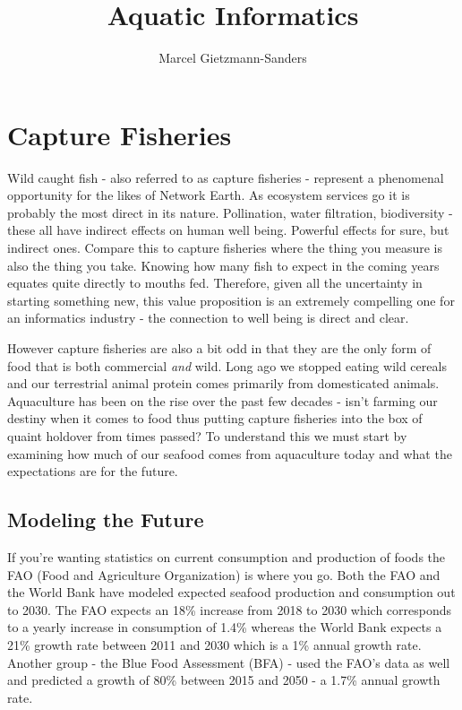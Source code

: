 \documentclass[11pt,a5paper]{book}
\title{Aquatic Informatics}
\author{Marcel Gietzmann-Sanders}
\date{}
\begin{document}
\maketitle
\tableofcontents
\newpage
\chapter{Capture Fisheries}
Wild caught fish - also referred to as capture fisheries - represent a phenomenal opportunity for the likes of Network Earth. As ecosystem services go it is probably the most direct in its nature. Pollination, water filtration, biodiversity - these all have indirect effects on human well being. Powerful effects for sure, but indirect ones. Compare this to capture fisheries where the thing you measure is also the thing you take. Knowing how many fish to expect in the coming years equates quite directly to mouths fed. Therefore, given all the uncertainty in starting something new, this value proposition is an extremely compelling one for an informatics industry - the connection to well being is direct and clear.
\newline

However capture fisheries are also a bit odd in that they are the only form of food that is both commercial \textit{and} wild. Long ago we stopped eating wild cereals and our terrestrial animal protein comes primarily from domesticated animals. Aquaculture has been on the rise over the past few decades - isn't farming our destiny when it comes to food thus putting capture fisheries into the box of quaint holdover from times passed? To understand this we must start by examining how much of our seafood comes from aquaculture today and what the expectations are for the future.

\section{Modeling the Future}

If you're wanting statistics on current consumption and production of foods the FAO (Food and Agriculture Organization) is where you go. Both the FAO \cite{faofish} and the World Bank \cite{wbfish} have modeled expected seafood production and consumption out to 2030. The FAO expects an 18\% increase from 2018 to 2030 which corresponds to a yearly increase in consumption of 1.4\% whereas the World Bank expects a 21\% growth rate between 2011 and 2030 which is a 1\% annual growth rate. Another group - the Blue Food Assessment (BFA) - used the FAO's data as well and predicted a growth of 80\% between 2015 and 2050 \cite{bfafish} - a 1.7\% annual growth rate. 
\newline
\end{document}
